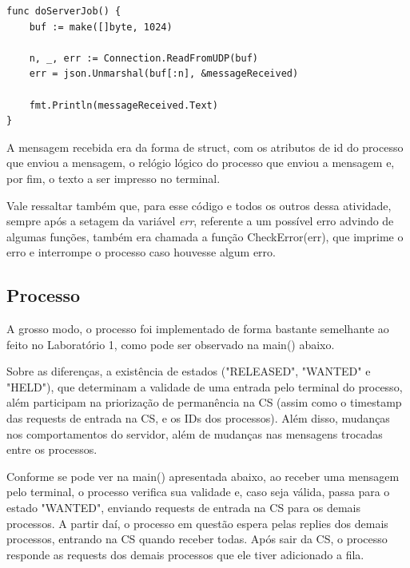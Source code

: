 \documentclass[conference]{IEEEtran}
\begin{document}
\begin{lstlisting}
func doServerJob() {
	buf := make([]byte, 1024)

	n, _, err := Connection.ReadFromUDP(buf)
	err = json.Unmarshal(buf[:n], &messageReceived)

	fmt.Println(messageReceived.Text)
}
\end{lstlisting}

	A mensagem recebida era da forma de struct, com os atributos de id do processo que enviou a mensagem, o relógio lógico do processo que enviou a mensagem e, por fim, o texto a ser impresso no terminal.

	Vale ressaltar também que, para esse código e todos os outros dessa atividade, sempre após a setagem da variável \textit{err}, referente a um possível erro advindo de algumas funções, também era chamada a função CheckError(err), que imprime o erro e interrompe o processo caso houvesse algum erro.
	
\subsection{Processo}

	A grosso modo, o processo foi implementado de forma bastante semelhante ao feito no Laboratório 1, como pode ser observado na main() abaixo. 
	
	Sobre as diferenças, a existência de estados ("RELEASED", "WANTED" e "HELD"), que determinam a validade de uma entrada pelo terminal do processo, além participam na priorização de permanência na CS (assim como o timestamp das requests de entrada na CS, e os IDs dos processos). Além disso, mudanças nos comportamentos do servidor, além de mudanças nas mensagens trocadas entre os processos.
	
	Conforme se pode ver na main() apresentada abaixo, ao receber uma mensagem pelo terminal, o processo verifica sua validade e, caso seja válida, passa para o estado "WANTED", enviando requests de entrada na CS para os demais processos. A partir daí, o processo em questão espera pelas replies dos demais processos, entrando na CS quando receber todas. Após sair da CS, o processo responde as requests dos demais processos que ele tiver adicionado a fila.
	
\end{document}

